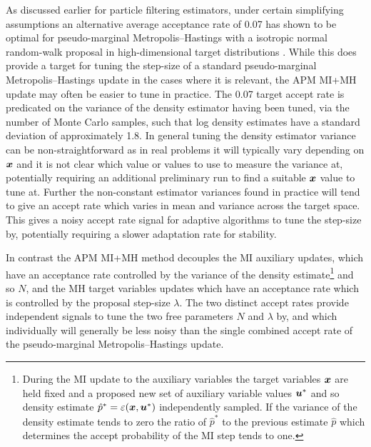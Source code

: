 As discussed earlier for particle filtering estimators, under certain simplifying assumptions an alternative average acceptance rate of 0.07 has shown to be optimal for pseudo-marginal Metropolis--Hastings with a isotropic normal random-walk proposal in high-dimensional target distributions \citep{sherlock2015efficiency}. While this does provide a target for tuning the step-size of a standard pseudo-marginal Metropolis--Hastings update in the cases where it is relevant, the \ac{APM} \ac{MI}+\ac{MH} update may often be easier to tune in practice. The 0.07 target accept rate is predicated on the variance of the density estimator having been tuned, via the number of Monte Carlo samples, such that log density estimates have a standard deviation of approximately 1.8. In general tuning the density estimator variance can be non-straightforward as in real problems it will typically vary depending on $\boldsymbol{x}$ and it is not clear which value or values to use to measure the variance at, potentially requiring an additional preliminary run to find a suitable $\boldsymbol{x}$ value to tune at. Further the non-constant estimator variances found in practice will tend to give an accept rate which varies in mean and variance across the target space. This gives a noisy accept rate signal for adaptive algorithms to tune the step-size by, potentially requiring a slower adaptation rate for stability. 

In contrast the \ac{APM} \ac{MI}+\ac{MH} method decouples the \ac{MI} auxiliary updates, which have an acceptance rate controlled by the variance of the density estimate\footnote{During the \ac{MI} update to the auxiliary variables the target variables $\boldsymbol{x}$ are held fixed and a proposed new set of auxiliary variable values $\boldsymbol{u}^*$ and so density estimate $\hat{p}^* = \varepsilon(\boldsymbol{x},\boldsymbol{u}^*)$ independently sampled. If the variance of the density estimate tends to zero the ratio of $\hat{p}^*$ to the previous estimate $\hat{p}$ which determines the accept probability of the \ac{MI} step tends to one.} and so $N$, and the \ac{MH} target variables updates which have an acceptance rate which is controlled by the proposal step-size $\lambda$.  The two distinct accept rates provide independent signals to tune the two free parameters $N$ and $\lambda$ by, and which individually will generally be less noisy than the single combined accept rate of the pseudo-marginal Metropolis--Hastings update. %

